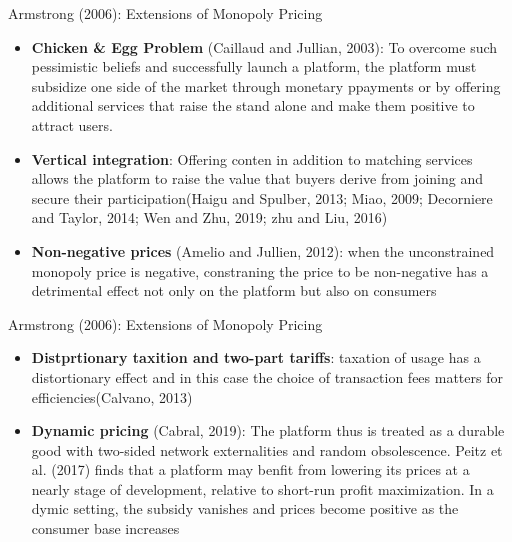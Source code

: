 \documentclass[aspectratio=169]{beamer}  %
\begin{document}
        

\begin{frame}{Armstrong (2006): Extensions of Monopoly Pricing}
    \justifying  %
    \begin{itemize}
        \item \textbf{Chicken \& Egg Problem} (Caillaud and Jullian, 2003): To overcome such pessimistic beliefs and successfully launch a platform, the platform must subsidize one side of the market through monetary ppayments or by offering additional services that raise the stand alone and make them positive to attract users.
        \vspace{1em}
        \item \textbf{Vertical integration}: Offering conten in addition to matching services allows the platform to raise the value that buyers derive from joining and secure their participation(Haigu and Spulber, 2013; Miao, 2009; Decorniere and Taylor, 2014; Wen and Zhu, 2019; zhu and Liu, 2016)
        \vspace{1em}
        \item \textbf{Non-negative prices} (Amelio and Jullien, 2012): when the unconstrained monopoly price is negative, constraning the price to be non-negative has a detrimental effect not only on the platform but also on consumers        
    \end{itemize}
    
\end{frame}

\begin{frame}{Armstrong (2006): Extensions of Monopoly Pricing}
    \justifying  %
    \begin{itemize}
        \item \textbf{Distprtionary taxition and two-part tariffs}: taxation of usage has a distortionary effect and in this case the choice of transaction fees matters for efficiencies(Calvano, 2013)
        \vspace{1em}
        \item \textbf{Dynamic pricing} (Cabral, 2019): The platform thus is treated as a durable good with two-sided network externalities and random obsolescence. Peitz et al. (2017) finds that a platform may benfit from lowering its prices at a nearly stage of development, relative to short-run profit maximization. In a dymic setting, the subsidy vanishes and prices become positive as the consumer base increases
        
    \end{itemize}
    
\end{frame}
\end{document}
